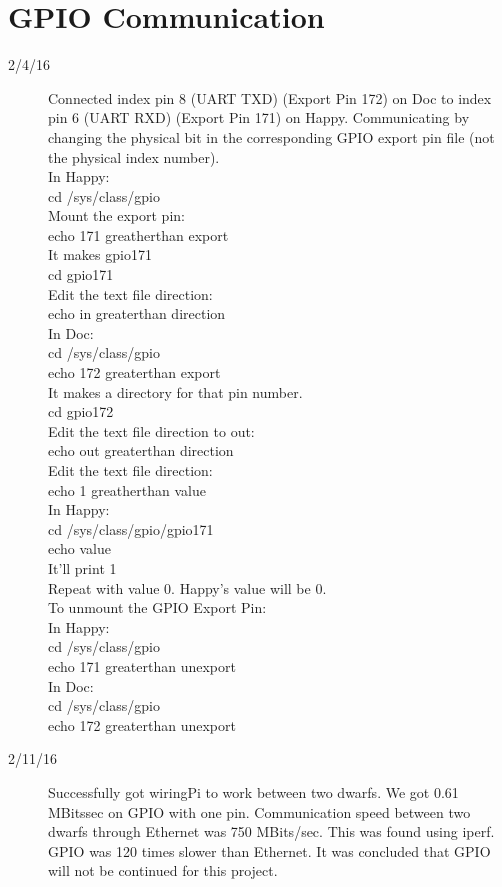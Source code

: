 \section{GPIO Communication}
\begin{description}
\item [2/4/16]  Connected index pin 8 (UART TXD) (Export Pin 172) on Doc to index pin 6 (UART RXD) (Export Pin 171) on Happy. Communicating by changing the physical bit in the corresponding GPIO export pin file (not the physical index number).  \\

In Happy: \\
cd /sys/class/gpio\\
Mount the export pin: \\
echo 171 greatherthan export\\
It makes gpio171\\
cd gpio171 \\
Edit the text file direction:\\
echo in greaterthan direction \\

In Doc: \\
cd /sys/class/gpio \\
echo 172 greaterthan export \\
It makes a directory for that pin number. \\
cd gpio172 \\
Edit the text file direction to out: \\
echo out greaterthan direction \\
Edit the text file direction: \\
echo 1 greatherthan value\\

In Happy: \\
cd /sys/class/gpio/gpio171 \\
echo value \\
It'll print 1\\

Repeat with value 0. Happy's value will be 0. \\

To unmount the GPIO Export Pin: \\
In Happy: \\
cd /sys/class/gpio \\
echo 171 greaterthan unexport \\

In Doc: \\
cd /sys/class/gpio \\
echo 172 greaterthan unexport

\item [2/11/16] Successfully got wiringPi to work between two dwarfs. We got 0.61 MBits\/sec on GPIO with one pin. Communication speed between two dwarfs through Ethernet was 750 MBits/sec. This was found using iperf. GPIO was 120 times slower than Ethernet. It was concluded that GPIO will not be continued for this project.

\end{description}

